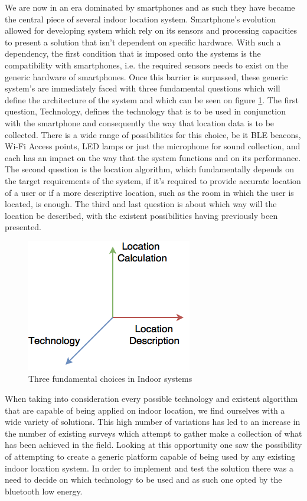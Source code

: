 \documentclass[a4paper]{IEEEtran}
\begin{document}
 
We are now in an era dominated by smartphones and as such they have became the central piece of several indoor location system. Smartphone's evolution allowed for developing system which rely on its sensors and processing capacities to present a solution that isn't dependent on specific hardware. With such a dependency, the first condition that is imposed onto the systems is the compatibility with smartphones, i.e. the required sensors needs to exist on the generic hardware of smartphones. Once this barrier is surpassed, these generic system's are immediately faced with three fundamental questions which will define the architecture of the system and which can be seen on figure \ref{fig:choices}. The first question, Technology, defines the technology that is to be used in conjunction with the smartphone and consequently the way that location data is to be collected. There is a wide range of possibilities for this choice, be it BLE beacons, Wi-Fi Access points, LED lamps or just the microphone for sound collection, and each has an impact on the way that the system functions and on its performance. The second question is the location algorithm, which fundamentally depends on the target requirements of the system, if it's required to provide accurate location of a user or if a more descriptive location, such as the room in which the user is located, is enough. The third and last question is about which way will the location be described, with the existent possibilities having previously been presented.  
 
 
\begin{figure}[htp] 
\centering 
\includegraphics[width=0.5\linewidth]{figures/vectors.png} 
\caption[]{Three fundamental choices in Indoor systems} 
\label{fig:choices} 
\end{figure} 
 
 
When taking into consideration every possible technology and existent algorithm that are capable of being applied on indoor location, we find ourselves with a wide variety of solutions. This high number of variations has led to an increase in the number of existing surveys which attempt to gather make a collection of what has been achieved in the field. Looking at this opportunity one saw the possibility of attempting to create a generic platform capable of being used by any existing indoor location system. In order to implement and test the solution there was a need to decide on which technology to be used and as such one opted by the bluetooth low energy. 
 
\end{document}
